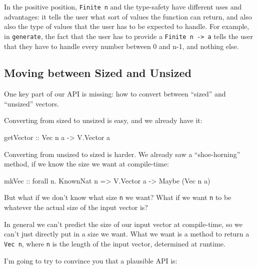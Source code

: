 \documentclass[]{article}
\newenvironment{Shaded}{}{}
\newcommand{\DataTypeTok}[1]{\textcolor[rgb]{0.56,0.13,0.00}{#1}}
\newcommand{\OtherTok}[1]{\textcolor[rgb]{0.00,0.44,0.13}{#1}}
\newcommand{\FunctionTok}[1]{\textcolor[rgb]{0.02,0.16,0.49}{#1}}
\newcommand{\NormalTok}[1]{#1}
\begin{document}
In the positive position, \texttt{Finite\ n} and the type-safety have different
uses and advantages: it tells the user what sort of values the function can
return, and also also the type of values that the user has to be expected to
handle. For example, in \texttt{generate}, the fact that the user has to provide
a \texttt{Finite\ n\ -\textgreater{}\ a} tells the user that they have to handle
every number between 0 and n-1, and nothing else.

\subsection{Moving between Sized and
Unsized}\label{moving-between-sized-and-unsized}

One key part of our API is missing: how to convert between ``sized'' and
``unsized'' vectors.

Converting from sized to unsized is easy, and we already have it:

\begin{Shaded}
\begin{Highlighting}[]
\OtherTok{getVector ::} \DataTypeTok{Vec}\NormalTok{ n a }\OtherTok{->} \DataTypeTok{V.Vector}\NormalTok{ a}
\end{Highlighting}
\end{Shaded}

Converting from unsized to sized is harder. We already saw a ``shoe-horning''
method, if we know the size we want at compile-time:

\begin{Shaded}
\begin{Highlighting}[]
\OtherTok{mkVec ::}\NormalTok{ forall n}\FunctionTok{.} \DataTypeTok{KnownNat}\NormalTok{ n }\OtherTok{=>} \DataTypeTok{V.Vector}\NormalTok{ a }\OtherTok{->} \DataTypeTok{Maybe}\NormalTok{ (}\DataTypeTok{Vec}\NormalTok{ n a)}
\end{Highlighting}
\end{Shaded}

But what if we don't know what size \texttt{n} we want? What if we want
\texttt{n} to be whatever the actual size of the input vector is?

In general we can't predict the size of our input vector at compile-time, so we
can't just directly put in a size we want. What we want is a method to return a
\texttt{Vec\ n}, where \texttt{n} is the length of the input vector, determined
at runtime.

I'm going to try to convince you that a plausible API is:
\end{document}

